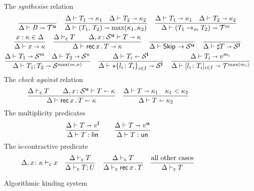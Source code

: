 \begin{figure}[h!]
  The \emph{synthesise} relation \hfill{}
  \begin{gather*}
    \frac{}{\algkindout{\tcBase}{\kindt^\Un}}
    \quad 
    \frac{
      \algkindout{T_1}{\kind_1}
      \quad
      \algkindout{T_2}{\kind_2}
    }{
      \algkindout{\tPair{T_1}{T_2}}{\max(\kind_1, \kind_2)}
    }
    \quad
    \frac{
      \algkindout{T_1}{\kind_1}
      \quad
      \algkindout{T_2}{\kind_2}
    }{
      \algkindout{(\tFun{T_1}{T_2})}{\kindt^m}
    }
    \\
    \frac{x : \kind \in \kindEnv}{\algkindout x \kind}
   \quad
  \frac{
    \isContractive T
    \qquad
    \algkindout[\kindEnv, x\colon \kinds^\Un] T \kind
  }{
    \algkindout{\tRec xT}{\kind}
  }
  \quad
  \frac{}{\kindEnv \Alg \tskip \rightarrow \kinds^\Un}
  \quad 
  \frac{}{\algkindout{\tMsg T}{\kinds^\Lin}}
  \\
  \frac{
    \algkindout{T_1}{\kinds^m}
    \quad
    \algkindout{T_2}{\kinds^n}
  }{
    \algkindout{\tSemi{T_1}{T_2}}{\kinds^{\max(m,n)}}
  }
  \quad
  \frac{
    \algkindin{T_i}{\kinds^\Lin}
  }{
    \algkindout{\tChoice{\{l_i\colon T_i\}}_{i\in I}}{\kinds^\Lin}
  }
  \quad
  \frac{
    \algkindout{T_i}{v^{m_i}}
  }{
    \algkindout{\tData{l_i\colon T_i}_{i\in I}}{\kindt^{\max(m_i)}}
  }
  \end{gather*}
  The \emph{check against} relation\hfill{}
  \begin{equation*}
    \frac{
      \isContractive T
      \qquad
      \algkindin[\kindEnv, x\colon \kinds^\Un] T \kind
    }{
      \algkindin{\tRec xT}{\kind}
    }
    \quad
    \frac{
      \algkindout{T}{\kind_1}
      \quad
      \isSubkind{\kind_1}{\kind_2}
    }{
      \algkindin T {\kind_2}
    }
  \end{equation*}
  The multiplicity predicates \hfill{}\quad{}
  \begin{equation*}
    \frac{
      \algkindout T {v^\Lin}
    }{
      \isLin T
    }
    \qquad
    \frac{
      \algkindout T {v^\Un}
    }{
      \isUn T
    }
  \end{equation*}
  The is-contractive predicate \hfill{}
  \begin{equation*}
    \isContractive[\kindEnv,x\colon\kind]{x}
    \quad 
    \frac{
      \isContractive{T}
    }{
      \isContractive{T;U}
    }
    \quad
    \frac{
      \isContractive{T}
    }{
      \isContractive{\tRecK xT}
    }
    \quad
    \frac{\text{all other cases}}{\isContractive{T}}
  \end{equation*}
  \caption{Algorithmic kinding system}
  \label{fig:kinding-system}
\end{figure}

